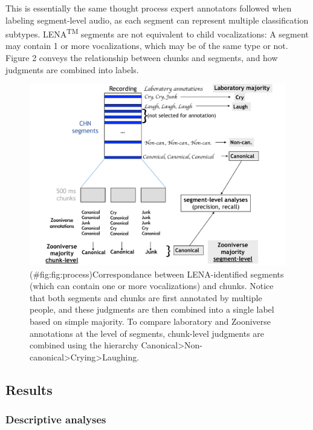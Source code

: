 \documentclass[english,,man]{apa6}
\begin{document}
This is essentially the same thought process expert annotators followed when labeling segment-level audio, as each segment can represent multiple classification subtypes. LENA\textsuperscript{TM} segments are not equivalent to child vocalizations: A segment may contain 1 or more vocalizations, which may be of the same type or not. Figure 2 conveys the relationship between chunks and segments, and how judgments are combined into labels.

\begin{figure}
\centering
\includegraphics{fig_levels.key.pdf}
\caption{(\#fig:fig:process)Correspondance between LENA-identified segments (which can contain one or more vocalizations) and chunks. Notice that both segments and chunks are first annotated by multiple people, and these judgments are then combined into a single label based on simple majority. To compare laboratory and Zooniverse annotations at the level of segments, chunk-level judgments are combined using the hierarchy Canonical\textgreater{}Non-canonical\textgreater{}Crying\textgreater{}Laughing.}
\end{figure}

\hypertarget{results}{%
\subsection{Results}\label{results}}

\hypertarget{descriptive-analyses}{%
\subsubsection{Descriptive analyses}\label{descriptive-analyses}}
\end{document}
